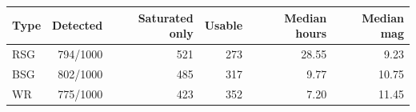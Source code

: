 \begin{tabular}{lrrrrr}\toprule
Type & Detected & Saturated only & Usable & Median hours & Median mag \\ \midrule
RSG & 794/1000 & 521 & 273 & 28.55 & 9.23 \\
BSG & 802/1000 & 485 & 317 & 9.77 & 10.75 \\
WR & 775/1000 & 423 & 352 & 7.20 & 11.45 \\
\bottomrule\end{tabular}